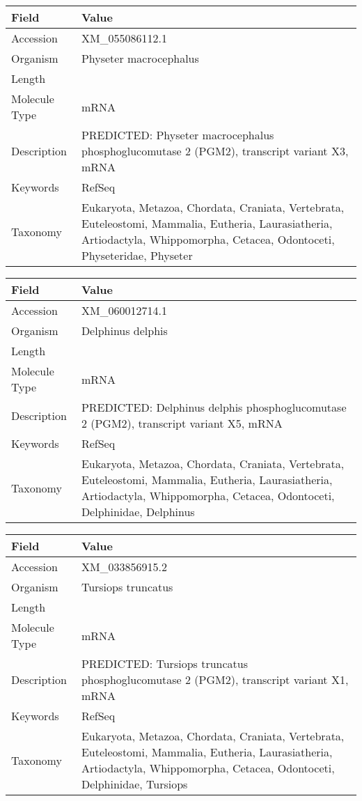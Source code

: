 \documentclass[10pt]{article}
\begin{document}
\vspace{1em}
{\footnotesize
\begin{longtable}{>{\raggedright\arraybackslash}p{4.5cm} >{\raggedright\arraybackslash}p{11.5cm}}
\textbf{Field} & \textbf{Value} \\
\hline
Accession & XM\_055086112.1 \\
Organism & Physeter macrocephalus \\
Length & 4259 \\
Molecule Type & mRNA \\
Description & PREDICTED: Physeter macrocephalus phosphoglucomutase 2 (PGM2), transcript variant X3, mRNA \\
Keywords & RefSeq \\
Taxonomy & Eukaryota, Metazoa, Chordata, Craniata, Vertebrata, Euteleostomi, Mammalia, Eutheria, Laurasiatheria, Artiodactyla, Whippomorpha, Cetacea, Odontoceti, Physeteridae, Physeter \\
\end{longtable}
}

\vspace{1em}
{\footnotesize
\begin{longtable}{>{\raggedright\arraybackslash}p{4.5cm} >{\raggedright\arraybackslash}p{11.5cm}}
\textbf{Field} & \textbf{Value} \\
\hline
Accession & XM\_060012714.1 \\
Organism & Delphinus delphis \\
Length & 6672 \\
Molecule Type & mRNA \\
Description & PREDICTED: Delphinus delphis phosphoglucomutase 2 (PGM2), transcript variant X5, mRNA \\
Keywords & RefSeq \\
Taxonomy & Eukaryota, Metazoa, Chordata, Craniata, Vertebrata, Euteleostomi, Mammalia, Eutheria, Laurasiatheria, Artiodactyla, Whippomorpha, Cetacea, Odontoceti, Delphinidae, Delphinus \\
\end{longtable}
}

\vspace{1em}
{\footnotesize
\begin{longtable}{>{\raggedright\arraybackslash}p{4.5cm} >{\raggedright\arraybackslash}p{11.5cm}}
\textbf{Field} & \textbf{Value} \\
\hline
Accession & XM\_033856915.2 \\
Organism & Tursiops truncatus \\
Length & 3481 \\
Molecule Type & mRNA \\
Description & PREDICTED: Tursiops truncatus phosphoglucomutase 2 (PGM2), transcript variant X1, mRNA \\
Keywords & RefSeq \\
Taxonomy & Eukaryota, Metazoa, Chordata, Craniata, Vertebrata, Euteleostomi, Mammalia, Eutheria, Laurasiatheria, Artiodactyla, Whippomorpha, Cetacea, Odontoceti, Delphinidae, Tursiops \\
\end{longtable}
}
\end{document}
